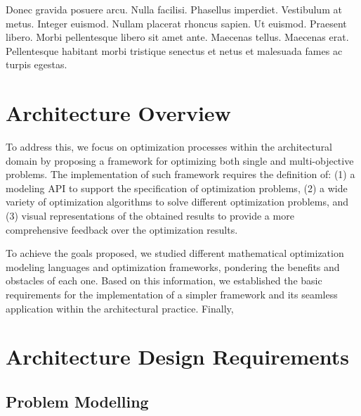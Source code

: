 \cleardoublepage
\label{chap:architecture}

Donec gravida posuere arcu. Nulla facilisi. Phasellus imperdiet. Vestibulum at metus. Integer euismod. Nullam placerat rhoncus sapien. Ut euismod. Praesent libero. Morbi pellentesque libero sit amet ante. Maecenas tellus. Maecenas erat. Pellentesque habitant morbi tristique senectus et netus et malesuada fames ac turpis egestas.

\section{Architecture Overview} 


To address this, we focus on optimization processes within the architectural domain by proposing a framework for optimizing both single and multi-objective problems. The implementation of such framework requires the definition of: (1) a modeling \ac{API} to support the specification of optimization problems, (2) a wide variety of optimization algorithms to solve different optimization problems, and (3) visual representations of the obtained results to provide a more comprehensive feedback over the optimization results.

To achieve the goals proposed, we studied different mathematical optimization modeling languages and optimization frameworks, pondering the benefits and obstacles of each one. Based on this information, we established the basic requirements for the implementation of a simpler framework and its seamless application within the architectural practice. 
Finally, 
\section{Architecture Design Requirements} 

\subsection{Problem Modelling}

